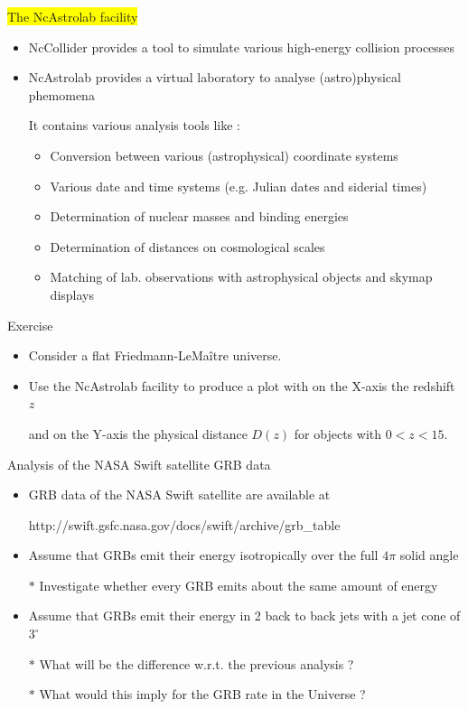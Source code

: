 \Tr
\onecolumn
\begin{center}
\colorbox{yellow}{The NcAstrolab facility}
\end{center}
%
\begin{itemize}
\item {\blue NcCollider} provides a tool to {\blue simulate various high-energy collision processes} 
\item {\blue NcAstrolab} provides a virtual laboratory to {\blue analyse (astro)physical phemomena}
\item[] It contains various analysis tools like :
\begin{itemize}
\item Conversion between various (astrophysical) coordinate systems
\item Various date and time systems (e.g. Julian dates and siderial times)
\item Determination of nuclear masses and binding energies
\item Determination of distances on cosmological scales
\item Matching of lab. observations with astrophysical objects and skymap displays
\end{itemize}
\end{itemize}
%
{\red
\begin{center}
Exercise
\end{center}
%
\begin{itemize}
\item Consider a flat Friedmann-LeMa\^{i}tre universe.
\item Use the NcAstrolab facility to produce a plot with on the X-axis the redshift $z$
\item[] and on the Y-axis the physical distance $D(z)$ for objects with $0<z<15$.
\end{itemize}
}%

\Tr
{\red
\begin{center}
Analysis of the NASA Swift satellite GRB data
\end{center}
%
\begin{itemize}
\item GRB data of the NASA Swift satellite are available at
\item[] http://swift.gsfc.nasa.gov/docs/swift/archive/grb\_table
\item Assume that GRBs emit their energy isotropically over the full $4\pi$ solid angle
\item[$\ast$] Investigate whether every GRB emits about the same amount of energy
\item Assume that GRBs emit their energy in 2 back to back jets with a jet cone of $3^{\circ}$
\item[$\ast$] What will be the difference w.r.t. the previous analysis ?
\item[$\ast$] What would this imply for the GRB rate in the Universe ?
\end{itemize}
}%
